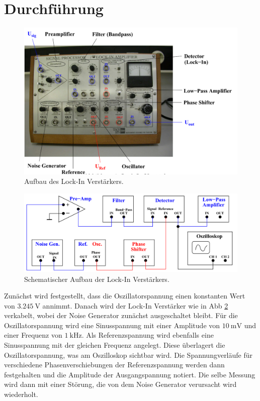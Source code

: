 \section{Durchführung}

\begin{figure}[H]
    \centering
    \includegraphics{Bilder/LockIn.png}
    \caption{Aufbau des Lock-In Verstärkers.}
    \label{fig:LockIn}
\end{figure}
\begin{figure}[H]
    \centering
    \includegraphics{Bilder/LockInShema.png}
    \caption{Schematischer Aufbau der Lock-In Verstärkers.}
    \label{fig:LockInSchema}
\end{figure}

\noindent Zunächst wird festgestellt, dass die Oszillatorspannung einen konstanten Wert von $\qty{3,245}{\volt}$ annimmt.
Danach wird der Lock-In Verstärker wie in Abb \ref{fig:LockInSchema} verkabelt, wobei der Noise Generator zunächst ausgeschaltet bleibt.
Für die Oszillatorspannung wird eine Sinusspannung mit einer Amplitude von $\qty{10}{\milli\volt}$ und einer Frequenz von 
$\qty{1}{\kilo\hertz}$. Als Referenzspannung wird ebenfalls eine Sinusspannung mit der gleichen Frequenz angelegt. Diese überlagert
die Oszillatorspannung, was am Oszilloskop sichtbar wird. Die Spannungverläufe für verschiedene Phasenverschiebungen der Referenzspannung
werden dann festgehalten und die Amplitude der Ausgangspannung notiert. Die selbe Messung wird dann mit einer Störung, die 
von dem Noise Generator verursacht wird wiederholt. \\

